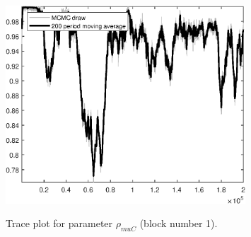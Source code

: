 \begin{figure}[H]
\centering
  \includegraphics[width=0.8\textwidth]{BRS_sectoral_rest/graphs/TracePlot_rho_muC_blck_1}\\
    \caption{Trace plot for parameter ${\rho_{muC}}$ (block number 1).}
\end{figure}
